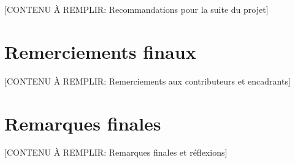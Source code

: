 [CONTENU À REMPLIR: Recommandations pour la suite du projet]

\section*{Remerciements finaux}

[CONTENU À REMPLIR: Remerciements aux contributeurs et encadrants]

\section*{Remarques finales}

[CONTENU À REMPLIR: Remarques finales et réflexions]
